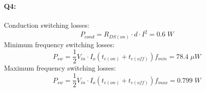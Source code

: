 \documentclass[a4paper,11pt]{article}
\begin{document}
\begin{preview}
\textbf{Q4:} \\\\
Conduction switching losses:
$$ P_{cond} = R_{DS(on)} \cdot d \cdot I^2 = 0.6\;W $$
Minimum frequency switching losses:
$$ P_{sw} = \frac{1}{2}V_{in} \cdot I_o (t_{c(on)} + t_{c(off)})f_{min} = 78.4 \;\mu W $$
Maximum frequency switching losses:
$$ P_{sw} = \frac{1}{2}V_{in} \cdot I_o (t_{c(on)} + t_{c(off)})f_{max} = 0.799 \; W $$


\end{preview}
\end{document}

